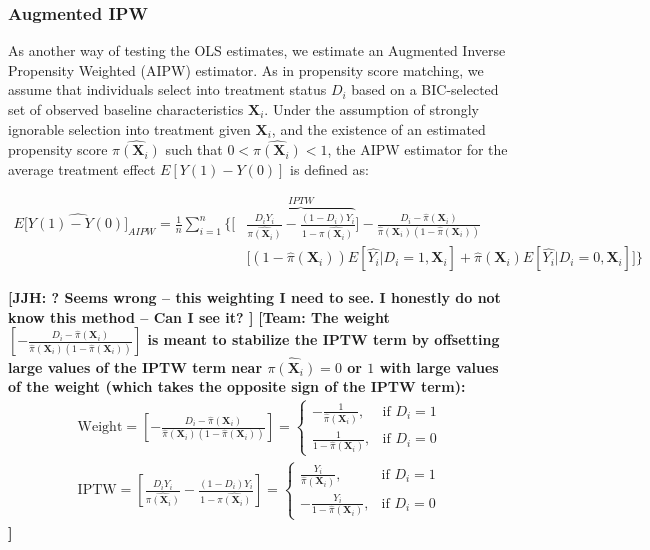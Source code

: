 \subsubsection{Augmented IPW} \label{subsubsection:aipw}

As another way of testing the OLS estimates, we estimate an Augmented Inverse Propensity Weighted (AIPW) estimator. As in propensity score matching, we assume that individuals select into treatment status $D_i$ based on a BIC-selected set of observed baseline characteristics $\boldsymbol{X}_i$. Under the assumption of strongly ignorable selection into treatment given $\boldsymbol{X}_i$, and the existence of an estimated propensity score $\hat{\pi({\boldsymbol{X}_i})}$ such that $0<\hat{\pi({\boldsymbol{X}_i})}<1$, the AIPW estimator for the average treatment effect $E[Y(1)-Y(0)]$ is defined as:

\begin{align}\label{eq:AIPW}
E[\widehat{Y(1)-Y(0)]}_{AIPW} = \frac{1}{n} \sum_{i=1}^{n} \bigg \{ \bigg[ & \overbrace{\frac{D_i Y_i}{\hat{\pi(\boldsymbol{X}_i)}} - \frac{(1-D_i)Y_i}{1-\hat{\pi(\boldsymbol{X}_i)}}}^{IPTW} \bigg]- \frac{D_i - \hat{\pi}(\boldsymbol{X}_i)}{\hat{\pi}(\boldsymbol{X}_i) (1-\hat{\pi}(\boldsymbol{X}_i))} \nonumber \\[10pt]
& \bigg[ (1-\hat{\pi}(\boldsymbol{X}_i)) E[\hat{Y_i}|D_i=1,\boldsymbol{X}_i] + \hat{\pi}(\boldsymbol{X}_i) E[\hat{Y_i}|D_i=0,\boldsymbol{X}_i] \bigg] \bigg \}
\end{align}

\noindent \textbf{[JJH: ? Seems wrong -- this weighting I need to see. I honestly do not know this method -- Can I see it? ]} \textbf{[Team: The weight $\left[-\frac{D_i - \hat{\pi}(\boldsymbol{X}_i)}{\hat{\pi}(\boldsymbol{X}_i) (1-\hat{\pi}(\boldsymbol{X}_i))}\right]$ is meant to stabilize the IPTW term by offsetting large values of the IPTW term near $\hat{\pi(\boldsymbol{X}_i)} = 0$ or $1$ with large values of the weight (which takes the opposite sign of the IPTW term): \\
\begin{align*}
	\text{Weight} = \left[-\frac{D_i - \hat{\pi}(\boldsymbol{X}_i)}{\hat{\pi}(\boldsymbol{X}_i) (1-\hat{\pi}(\boldsymbol{X}_i))}\right] = 
	 \begin{cases} 
		-\frac{1}{\hat{\pi}(\boldsymbol{X}_i)}, &\text{if  } D_i=1 \\ 
		\frac{1}{1-\hat{\pi}(\boldsymbol{X}_i)}, &\text{if  } D_i=0
	\end{cases} \\[10pt]
	\text{IPTW}= \left[\frac{D_i Y_i}{\hat{\pi(\boldsymbol{X}_i)}} - \frac{(1-D_i)Y_i}{1-\hat{\pi(\boldsymbol{X}_i)}}\right]= 
	 \begin{cases} 
		\frac{Y_i}{\hat{\pi}(\boldsymbol{X}_i)}, &\text{if  } D_i=1 \\ 
		-\frac{Y_i}{1-\hat{\pi}(\boldsymbol{X}_i)}, &\text{if  } D_i=0
	\end{cases}
\end{align*}
]}\\

